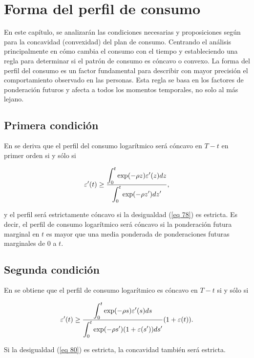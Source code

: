 \chapter{Forma del perfil de consumo} \label{cap_4}

En este capítulo, se analizarán las condiciones necesarias y proposiciones según \parencite{feigenbaum2021deviation} para la concavidad (convexidad) del plan de consumo. Centrando el análisis principalmente en cómo cambia el consumo con el tiempo y estableciendo una regla para determinar si el patrón de consumo es cóncavo o convexo. La forma del perfil del consumo es un factor fundamental para describir con mayor precisión el comportamiento observado en las personas. Esta regla se basa en los factores de ponderación futuros y afecta a todos los momentos temporales, no solo al más lejano.

\section{Primera condición}
En \parencite{feigenbaum2021deviation} se deriva que el perfil del consumo logarítmico será cóncavo en $T - t$ en primer orden si y sólo si

\begin{equation}
\label{eq 78}
    \varepsilon'(t) \geq \dfrac{\displaystyle \int_0^t \exp (-\rho z) \varepsilon' (z) dz}{\displaystyle \int_0^t \exp (- \rho z') dz'},
\end{equation}

\noindent y el perfil será estrictamente cóncavo si la desigualdad (\ref{eq 78}) es estricta. Es decir, el perfil de consumo logarítmico será cóncavo si la ponderación futura marginal en $t$ es mayor que una media ponderada de ponderaciones futuras marginales de $0$ a $t$.
\hfill 

\section{Segunda condición}
En \parencite{feigenbaum2021deviation} se obtiene que el perfil de consumo logarítmico es cóncavo en $T - t$ si y sólo si

\begin{equation}
\label{eq 80}
\varepsilon' (t) \geq \dfrac{\displaystyle \int_0^t \exp (- \rho s) \varepsilon' (s) ds}{\displaystyle \int_0^t \exp (-\rho s')(1+ \varepsilon(s')) ds'}(1+ \varepsilon(t)).
\end{equation}

\noindent Si la desigualdad (\ref{eq 80}) es estricta, la concavidad también será estricta.

